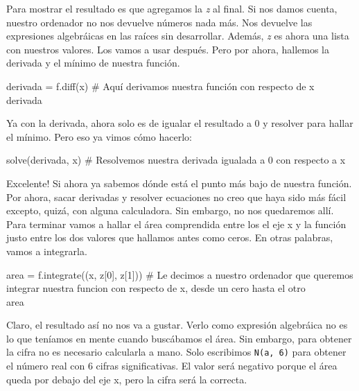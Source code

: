 \documentclass[10pt,letterpaper]{article}
\newcommand{\inlinecode}[1]{
\colorbox{light-gray}{\texttt{#1}}
}
\newenvironment{Code}
{
\begin{lrbox}{\selvestebox}%
\begin{minipage}{\dimexpr\columnwidth-2\fboxsep\relax}
\fontfamily{\ttdefault}\selectfont
}
{\end{minipage}\end{lrbox}%
\begin{center}
\colorbox{light-gray}{\usebox{\selvestebox}}
\end{center}
}
\begin{document}
Para mostrar el resultado es que agregamos la \emph{z} al final. Si nos damos cuenta, nuestro ordenador no nos devuelve n\'umeros nada m\'as. Nos devuelve las expresiones algebr\'aicas en las ra\'ices sin desarrollar. Adem\'as, \emph{z} es ahora una lista con nuestros valores. Los vamos a usar despu\'es. Pero por ahora, hallemos la derivada y el m\'inimo de nuestra funci\'on.

\begin{footnotesize}
\begin{Code}
derivada = f.diff(x) \# Aqu\'i derivamos nuestra funci\'on con respecto de x\\
derivada
\end{Code}
\end{footnotesize}

Ya con la derivada, ahora solo es de igualar el resultado a 0 y resolver para hallar el m\'inimo. Pero eso ya vimos c\'omo hacerlo:

\begin{footnotesize}
\begin{Code}
solve(derivada, x) \# Resolvemos nuestra derivada igualada a 0 con respecto a x
\end{Code}
\end{footnotesize}

Excelente! Si ahora ya sabemos d\'onde est\'a el punto m\'as bajo de nuestra funci\'on. Por ahora, sacar derivadas y resolver ecuaciones no creo que haya sido m\'as f\'acil excepto, quiz\'a, con alguna calculadora. Sin embargo, no nos quedaremos all\'i. Para terminar vamos a hallar el \'area comprendida entre los el eje x y la funci\'on justo entre los dos valores que hallamos antes como ceros. En otras palabras, vamos a integrarla.

\begin{footnotesize}
\begin{Code}
area = f.integrate((x, z[0], z[1])) \# Le decimos a nuestro ordenador que queremos integrar nuestra funcion con respecto de x, desde un cero hasta el otro\\
area
\end{Code}
\end{footnotesize}

Claro, el resultado as\'i no nos va a gustar. Verlo como expresi\'on algebr\'aica no es lo que ten\'iamos en mente cuando busc\'abamos el \'area. Sin embargo, para obtener la cifra no es necesario calcularla a mano. Solo escribimos \inlinecode{N(a, 6)} para obtener el n\'umero real con 6 cifras significativas. El valor ser\'a negativo porque el \'area queda por debajo del eje x, pero la cifra ser\'a la correcta.\\
\end{document}

